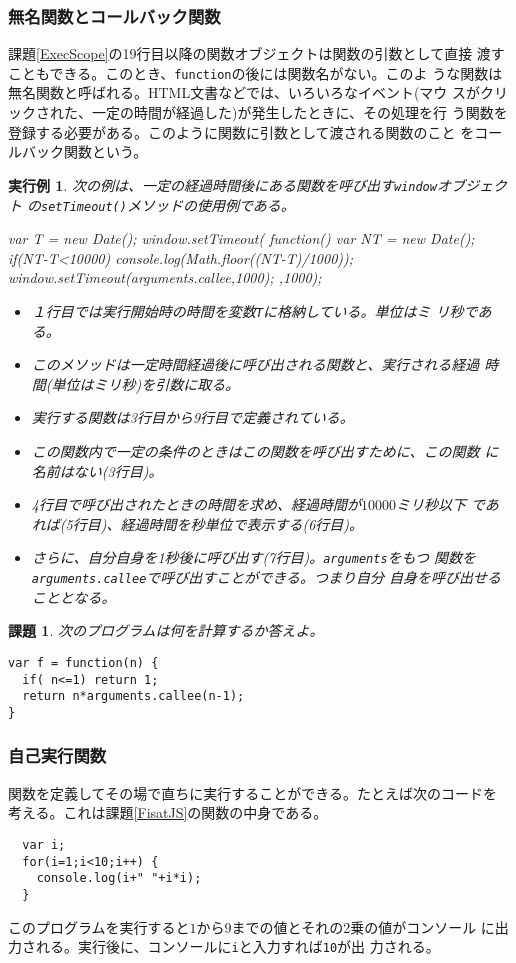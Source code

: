 \documentclass[a4j]{jarticle}
\newtheorem{Prob}{課題}[section]
\newtheorem{Exec}{実行例}[section]
\begin{document}
\subsubsection{無名関数とコールバック関数}
課題\ref{ExecScope}の19行目以降の関数オブジェクトは関数の引数として直接
渡すこともできる。このとき、\verb+function+の後には関数名がない。このよ
うな関数は無名関数と呼ばれる。HTML文書などでは、いろいろなイベント(マウ
スがクリックされた、一定の時間が経過した)が発生したときに、その処理を行
う関数を登録する必要がある。このように関数に引数として渡される関数のこと
をコールバック関数という。
\begin{Exec}
 次の例は、一定の経過時間後にある関数を呼び出す\verb+window+オブジェクト
 の\verb+setTimeout()+メソッドの使用例である。
\begin{listing}{1}
var T = new Date();
window.setTimeout(
  function(){
    var NT = new Date();
    if(NT-T<10000) {
      console.log(Math.floor((NT-T)/1000));
      window.setTimeout(arguments.callee,1000);
    }
   },1000);
\end{listing}
\begin{itemize}
 \item １行目では実行開始時の時間を変数\verb+T+に格納している。単位はミ
       リ秒である。
 \item このメソッドは一定時間経過後に呼び出される関数と、実行される経過
       時間(単位はミリ秒)を引数に取る。
 \item 実行する関数は3行目から9行目で定義されている。
 \item この関数内で一定の条件のときはこの関数を呼び出すために、この関数
       に名前はない(3行目)。
 \item 4行目で呼び出されたときの時間を求め、経過時間が$10000$ミリ秒以下
       であれば(5行目)、経過時間を秒単位で表示する(6行目)。
 \item さらに、自分自身を1秒後に呼び出す(7行目)。\verb+arguments+をもつ
       関数を\verb+arguments.callee+で呼び出すことができる。つまり自分
       自身を呼び出せることとなる。
\end{itemize}
\end{Exec}
\begin{Prob}
次のプログラムは何を計算するか答えよ。
\begin{Verbatim}
var f = function(n) {
  if( n<=1) return 1;
  return n*arguments.callee(n-1);
}
\end{Verbatim}
\end{Prob}
\subsubsection{自己実行関数}
関数を定義してその場で直ちに実行することができる。たとえば次のコードを
考える。これは課題\ref{FisatJS}の関数の中身である。
\begin{Verbatim}
  var i;
  for(i=1;i<10;i++) {
    console.log(i+" "+i*i);
  }
\end{Verbatim}
このプログラムを実行すると$1$から$9$までの値とそれの2乗の値がコンソール
に出力される。実行後に、コンソールに\verb+i+と入力すれば\verb+10+が出
力される。
\end{document}
